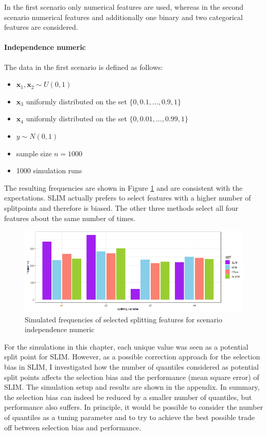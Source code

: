 In the first scenario only numerical features are used, whereas in the second scenario numerical features and additionally one binary and two categorical features are considered.

\paragraph{Independence numeric\\}
The data in the first scenario is defined as follows:
\begin{itemize}
    \item $\textbf{x}_{1}, \textbf{x}_{2} \sim U(0,1)$
    \item $\textbf{x}_3$ uniformly distributed on the set $\{0, 0.1,..., 0.9, 1\}$
    \item $\textbf{x}_4$ uniformly distributed on the set $\{0, 0.01,..., 0.99, 1\}$
    \item $y \sim N(0,1)$
    \item sample size $n = 1000$
    \item 1000 simulation runs
\end{itemize}

The resulting frequencies are shown in Figure \ref{fig:selection_bias_independence_numeric} and are consistent with the expectations. SLIM actually prefers to select features with a higher number of splitpoints and therefore is biased. The other three methods select all four features about the same number of times.

\begin{figure}[!htb]
    \centering
    \includegraphics[width=16cm]{Figures/simulations/batchtools/selection_bias_general/independence_numerical.png}
    \caption{Simulated frequencies of selected splitting features for scenario independence numeric}
    \label{fig:selection_bias_independence_numeric}
\end{figure}

For the simulations in this chapter, each unique value was seen as a potential split point for SLIM.
However, as a possible correction approach for the selection bias in SLIM, I investigated how the number of quantiles considered as potential split points affects the selection bias and the performance (mean square error) of SLIM. The simulation setup and results are shown in the appendix. In summary, the selection bias can indeed be reduced by a smaller number of quantiles, but performance also suffers. In principle, it would be possible to consider the number of quantiles as a tuning parameter and to try to achieve the best possible trade off between selection bias and performance. 



